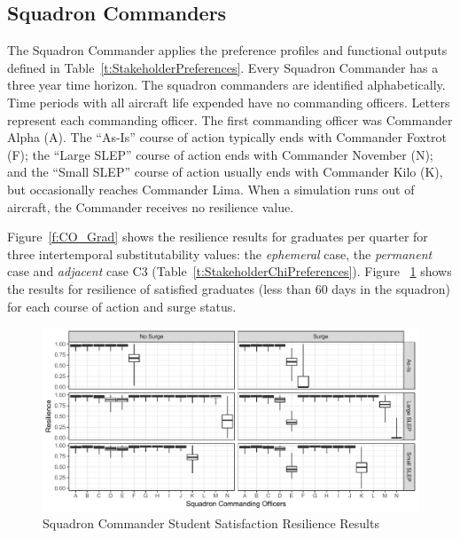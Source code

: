\documentclass[preprint,12pt]{elsarticle}
\begin{document}
\subsection{Squadron Commanders}

The Squadron Commander applies the preference profiles and functional
outputs defined in Table~\ref{t:StakeholderPreferences}. Every
Squadron Commander has a three year time horizon. The squadron commanders are
identified alphabetically. Time periods with all aircraft life
expended have no commanding officers. Letters represent each
commanding officer. The first commanding officer was 
Commander Alpha (A). The ``As-Is'' course of action typically ends
with Commander Foxtrot (F); the ``Large SLEP'' course of action ends
with Commander November (N); and the ``Small SLEP'' course of action
usually ends with Commander Kilo (K), but occasionally reaches
Commander Lima. When a simulation runs out of aircraft, the Commander
receives no resilience value.

Figure~\ref{f:CO_Grad} shows the resilience
results for graduates per quarter for three intertemporal
substitutability values: the \emph{ephemeral} case, the
\emph{permanent} case and  \emph{adjacent} case C3
(Table~\ref{t:StakeholderChiPreferences}). Figure ~\ref{f:CO_Sat} shows the results for
resilience of satisfied graduates (less than 60 days in the squadron)
for each course of action and surge status.

\begin{figure}[h]
  \centering\includegraphics[width=5in]{CO_Sat}
  \caption{Squadron Commander Student Satisfaction Resilience Results
  \label{f:CO_Sat}}
\end{figure}
\end{document}
